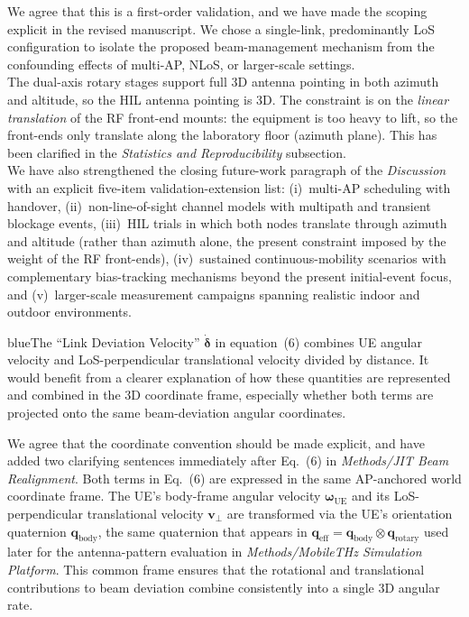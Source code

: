 \documentclass{article}
\newcommand{\blue}[1]{\begin{color}{blue}#1\end{color}}
\begin{document}
\noindent We agree that this is a first-order validation, and we have made the scoping explicit in the revised manuscript. We chose a single-link, predominantly LoS configuration to isolate the proposed beam-management mechanism from the confounding effects of multi-AP, NLoS, or larger-scale settings.\\

\noindent The dual-axis rotary stages support full 3D antenna pointing in both azimuth and altitude, so the HIL antenna pointing is 3D. The constraint is on the \emph{linear translation} of the RF front-end mounts: the equipment is too heavy to lift, so the front-ends only translate along the laboratory floor (azimuth plane). This has been clarified in the \emph{Statistics and Reproducibility} subsection.\\

\noindent We have also strengthened the closing future-work paragraph of the \emph{Discussion} with an explicit five-item validation-extension list: (i)~multi-AP scheduling with handover, (ii)~non-line-of-sight channel models with multipath and transient blockage events, (iii)~HIL trials in which both nodes translate through azimuth and altitude (rather than azimuth alone, the present constraint imposed by the weight of the RF front-ends), (iv)~sustained continuous-mobility scenarios with complementary bias-tracking mechanisms beyond the present initial-event focus, and (v)~larger-scale measurement campaigns spanning realistic indoor and outdoor environments.

\begin{tcbremark}
{\selectfont
\blue{The ``Link Deviation Velocity'' $\dot{\boldsymbol\delta}$ in equation~(6) combines UE angular velocity and LoS-perpendicular translational velocity divided by distance. It would benefit from a clearer explanation of how these quantities are represented and combined in the 3D coordinate frame, especially whether both terms are projected onto the same beam-deviation angular coordinates.}
}
\end{tcbremark}

\noindent We agree that the coordinate convention should be made explicit, and have added two clarifying sentences immediately after Eq.~(6) in \emph{Methods/JIT Beam Realignment}. Both terms in Eq.~(6) are expressed in the same AP-anchored world coordinate frame. The UE's body-frame angular velocity $\boldsymbol\omega_{\text{UE}}$ and its LoS-perpendicular translational velocity $\mathbf{v}_\perp$ are transformed via the UE's orientation quaternion $\mathbf{q}_{\text{body}}$, the same quaternion that appears in $\mathbf{q}_{\text{eff}} = \mathbf{q}_{\text{body}} \otimes \mathbf{q}_{\text{rotary}}$ used later for the antenna-pattern evaluation in \emph{Methods/MobileTHz Simulation Platform}. This common frame ensures that the rotational and translational contributions to beam deviation combine consistently into a single 3D angular rate.
\end{document}
